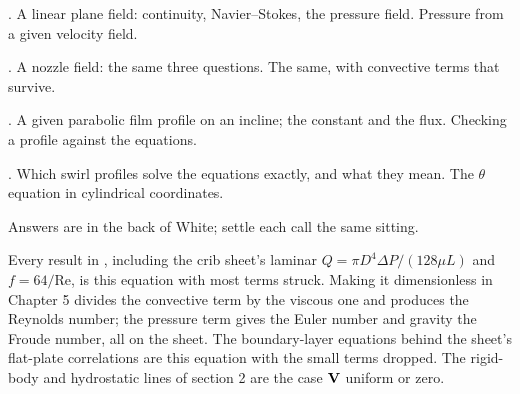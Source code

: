 \begin{ladder}
\item {}. A linear plane field: continuity, Navier--Stokes, the pressure field. Pressure from a given velocity field.
\item {}. A nozzle field: the same three questions. The same, with convective terms that survive.
\item {}. A given parabolic film profile on an incline; the constant and the flux. Checking a profile against the equations.
\item {}. Which swirl profiles solve the equations exactly, and what they mean. The $\theta$ equation in cylindrical coordinates.
\end{ladder}
Answers are in the back of White; settle each call the same sitting.


\begin{hides}
Every result in , including the crib sheet's laminar $Q = \pi D^4\Delta P/(128\mu L)$ and $f = 64/\text{Re}$, is this equation with most terms struck. Making it dimensionless in Chapter 5 divides the convective term by the viscous one and produces the Reynolds number; the pressure term gives the Euler number and gravity the Froude number, all on the sheet. The boundary-layer equations behind the sheet's flat-plate correlations are this equation with the small terms dropped. The rigid-body and hydrostatic lines of section 2 are the case $\mathbf{V}$ uniform or zero.
\end{hides}
